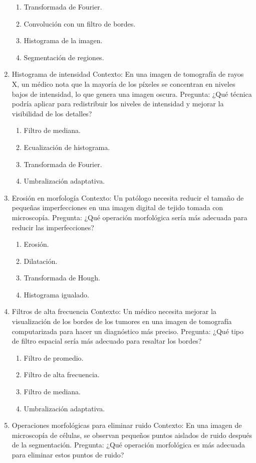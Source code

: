 \documentclass[12pt,a4paper]{article}
\providecommand{\tightlist}{%
  \setlength{\itemsep}{0pt}\setlength{\parskip}{0pt}}\usepackage{longtable,booktabs,array}
\providecommand{\tightlist}{%
  \setlength{\itemsep}{0pt}\setlength{\parskip}{2pt}}
\begin{document}
\begin{enumerate}
  \begin{enumerate}
  \tightlist
  \item
    Transformada de Fourier.
  \item
    Convolución con un filtro de bordes.
  \item
    Histograma de la imagen.
  \item
    Segmentación de regiones.
  \end{enumerate}
\item
  Histograma de intensidad Contexto: En una imagen de tomografía de
  rayos X, un médico nota que la mayoría de los píxeles se concentran en
  niveles bajos de intensidad, lo que genera una imagen oscura.
  Pregunta: ¿Qué técnica podría aplicar para redistribuir los niveles de
  intensidad y mejorar la visibilidad de los detalles?

  \begin{enumerate}
  \tightlist
  \item
    Filtro de mediana.
  \item
    Ecualización de histograma.
  \item
    Transformada de Fourier.
  \item
    Umbralización adaptativa.
  \end{enumerate}
\item
  Erosión en morfología Contexto: Un patólogo necesita reducir el tamaño
  de pequeñas imperfecciones en una imagen digital de tejido tomada con
  microscopía. Pregunta: ¿Qué operación morfológica sería más adecuada
  para reducir las imperfecciones?

  \begin{enumerate}
  \tightlist
  \item
    Erosión.
  \item
    Dilatación.
  \item
    Transformada de Hough.
  \item
    Histograma igualado.
  \end{enumerate}
\item
  Filtros de alta frecuencia Contexto: Un médico necesita mejorar la
  visualización de los bordes de los tumores en una imagen de tomografía
  computarizada para hacer un diagnóstico más preciso. Pregunta: ¿Qué
  tipo de filtro espacial sería más adecuado para resaltar los bordes?

  \begin{enumerate}
  \tightlist
  \item
    Filtro de promedio.
  \item
    Filtro de alta frecuencia.
  \item
    Filtro de mediana.
  \item
    Umbralización adaptativa.
  \end{enumerate}
\item
  Operaciones morfológicas para eliminar ruido Contexto: En una imagen
  de microscopía de células, se observan pequeños puntos aislados de
  ruido después de la segmentación. Pregunta: ¿Qué operación morfológica
  es más adecuada para eliminar estos puntos de ruido?


\end{enumerate}
\end{document}
